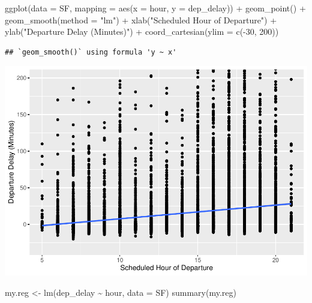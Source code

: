 \documentclass[
]{article}
\newenvironment{Shaded}{\begin{snugshade}}{\end{snugshade}}
\newcommand{\AttributeTok}[1]{\textcolor[rgb]{0.77,0.63,0.00}{#1}}
\newcommand{\DecValTok}[1]{\textcolor[rgb]{0.00,0.00,0.81}{#1}}
\newcommand{\FunctionTok}[1]{\textcolor[rgb]{0.00,0.00,0.00}{#1}}
\newcommand{\NormalTok}[1]{#1}
\newcommand{\OtherTok}[1]{\textcolor[rgb]{0.56,0.35,0.01}{#1}}
\newcommand{\SpecialCharTok}[1]{\textcolor[rgb]{0.00,0.00,0.00}{#1}}
\newcommand{\StringTok}[1]{\textcolor[rgb]{0.31,0.60,0.02}{#1}}
\begin{document}
\begin{Shaded}
\begin{Highlighting}[]
\FunctionTok{ggplot}\NormalTok{(}\AttributeTok{data =}\NormalTok{ SF, }\AttributeTok{mapping =} \FunctionTok{aes}\NormalTok{(}\AttributeTok{x =}\NormalTok{ hour, }\AttributeTok{y =}\NormalTok{ dep\_delay)) }\SpecialCharTok{+}
  \FunctionTok{geom\_point}\NormalTok{() }\SpecialCharTok{+}
  \FunctionTok{geom\_smooth}\NormalTok{(}\AttributeTok{method =} \StringTok{"lm"}\NormalTok{) }\SpecialCharTok{+}
  \FunctionTok{xlab}\NormalTok{(}\StringTok{"Scheduled Hour of Departure"}\NormalTok{) }\SpecialCharTok{+} \FunctionTok{ylab}\NormalTok{(}\StringTok{"Departure Delay (Minutes)"}\NormalTok{) }\SpecialCharTok{+}
  \FunctionTok{coord\_cartesian}\NormalTok{(}\AttributeTok{ylim =} \FunctionTok{c}\NormalTok{(}\SpecialCharTok{{-}}\DecValTok{30}\NormalTok{, }\DecValTok{200}\NormalTok{))}
\end{Highlighting}
\end{Shaded}

\begin{verbatim}
## `geom_smooth()` using formula 'y ~ x'
\end{verbatim}

\includegraphics{Class_Exercises_ClassNotes_5_files/figure-latex/unnamed-chunk-32-1.pdf}
\newpage

\begin{Shaded}
\begin{Highlighting}[]
\NormalTok{my.reg }\OtherTok{\textless{}{-}} \FunctionTok{lm}\NormalTok{(dep\_delay }\SpecialCharTok{\textasciitilde{}}\NormalTok{ hour, }\AttributeTok{data =}\NormalTok{ SF)}
\FunctionTok{summary}\NormalTok{(my.reg)}
\end{Highlighting}
\end{Shaded}
\end{document}
